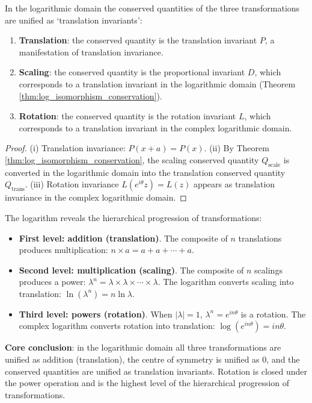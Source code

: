 \begin{proposition}\label{prop:log_conservation_unification}
In the logarithmic domain the conserved quantities of the three transformations are unified as `translation invariants':
\begin{enumerate}[label=(\roman*)]
    \item \textbf{Translation}: the conserved quantity is the translation invariant $P$, a manifestation of translation invariance.
    \item \textbf{Scaling}: the conserved quantity is the proportional invariant $D$, which corresponds to a translation invariant in the logarithmic domain (Theorem \ref{thm:log_isomorphism_conservation}).
    \item \textbf{Rotation}: the conserved quantity is the rotation invariant $L$, which corresponds to a translation invariant in the complex logarithmic domain.
\end{enumerate}
\end{proposition}

\begin{proof}
(i) Translation invariance: $P(x+a) = P(x)$.
(ii) By Theorem \ref{thm:log_isomorphism_conservation}, the scaling conserved quantity $Q_{\text{scale}}$ is converted in the logarithmic domain into the translation conserved quantity $Q_{\text{trans}}$.
(iii) Rotation invariance $L(e^{i\theta}z) = L(z)$ appears as translation invariance in the complex logarithmic domain.
\end{proof}

\begin{remark}\label{rem:hierarchy_logarithm}
The logarithm reveals the hierarchical progression of transformations:
\begin{itemize}
    \item \textbf{First level: addition (translation)}. The composite of $n$ translations produces multiplication: $n \times a = a + a + \cdots + a$.
    \item \textbf{Second level: multiplication (scaling)}. The composite of $n$ scalings produces a power: $\lambda^n = \lambda \times \lambda \times \cdots \times \lambda$. The logarithm converts scaling into translation: $\ln(\lambda^n) = n\ln\lambda$.
    \item \textbf{Third level: powers (rotation)}. When $|\lambda| = 1$, $\lambda^n = e^{in\theta}$ is a rotation. The complex logarithm converts rotation into translation: $\log(e^{in\theta}) = in\theta$.
\end{itemize}
\textbf{Core conclusion}: in the logarithmic domain all three transformations are unified as addition (translation), the centre of symmetry is unified as $0$, and the conserved quantities are unified as translation invariants. Rotation is closed under the power operation and is the highest level of the hierarchical progression of transformations.
\end{remark}

